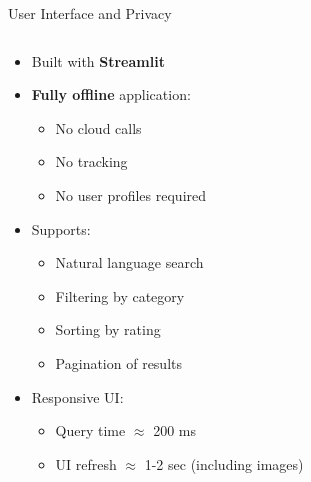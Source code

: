 \begin{frame}{User Interface and Privacy}

\begin{columns}[T]
  \begin{column}{0.40\textwidth}
    \begin{itemize}
        \item Built with \textbf{Streamlit}
        \item \textbf{Fully offline} application:
          \begin{itemize}
            \item No cloud calls
            \item No tracking
            \item No user profiles required
          \end{itemize}
        \item Supports:
          \begin{itemize}
            \item Natural language search
            \item Filtering by category
            \item Sorting by rating
            \item Pagination of results
          \end{itemize}
        \item Responsive UI:
          \begin{itemize}
            \item Query time $\approx$ 200 ms
            \item UI refresh $\approx$ 1-2 sec (including images)
          \end{itemize}
    \end{itemize}
  \end{column}

  \begin{column}{0.55\textwidth}
    \centering
  \end{column}
\end{columns}

\end{frame}
